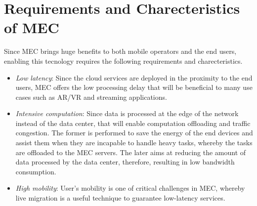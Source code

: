 \section{Requirements and Charecteristics of MEC}  \label{requirements}

Since MEC brings huge benefits to both mobile operators and the end users, enabling this tecnology requires the following requirements and charecteristics.

\begin{itemize}

\item \textit{\textit{Low latency}}: Since the cloud services are deployed in the proximity to the end users, MEC offers the low processing delay that will be beneficial to many use cases such as AR/VR and streaming applications.

\item \textit{\textit{Intensive computation}}: Since data is processed at the edge of the network instead of the data center, that will enable computation offloading and traffic congestion. The former is performed to save the energy of the end devices and assist them when they are incapable to handle heavy tasks, whereby the tasks are offloaded to the MEC servers. The later aims at reducing the amount of data processed by the data center, therefore, resulting in low bandwidth consumption.

\item \textit{\textit{High mobility}}: User's mobility is one of critical challenges in MEC, whereby live migration is a useful technique to guarantee low-latency services.

\end{itemize}
